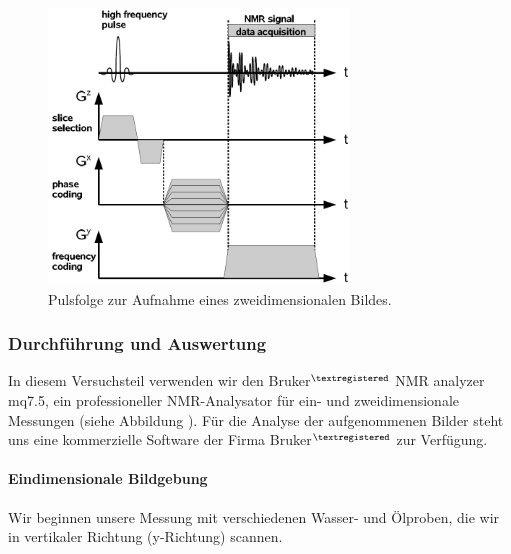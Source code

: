 \documentclass[a4paper]{scrartcl} %
\begin{document}
\begin{figure}[H]
	\centering
	\includegraphics[width=80mm]{./Resources/2d_imaging.png}
	\caption{Pulsfolge zur Aufnahme eines zweidimensionalen Bildes.}
	\label{fig:2d_imaging}
\end{figure}

\subsubsection{Durchführung und Auswertung}

In diesem Versuchsteil verwenden wir den \textsf{Bruker$^{\textregistered}$ NMR analyzer mq7.5}, ein professioneller NMR-Analysator für ein- und zweidimensionale Messungen (siehe Abbildung ). Für die Analyse der aufgenommenen Bilder steht uns eine kommerzielle Software der Firma \textsf{Bruker$^{\textregistered}$} zur Verfügung.

\paragraph{Eindimensionale Bildgebung}

Wir beginnen unsere Messung mit verschiedenen Wasser- und Ölproben, die wir in vertikaler Richtung (y-Richtung) scannen.
\end{document}
